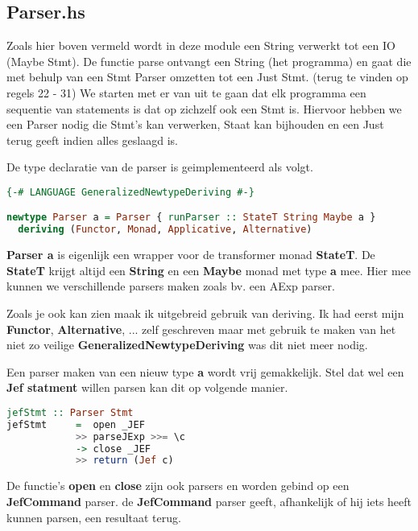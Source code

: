 \documentclass[]{article}
\begin{document}
\subsection{Parser.hs}

Zoals hier boven vermeld wordt in deze module een String verwerkt tot een IO (Maybe Stmt). De functie parse ontvangt een String (het programma) en gaat die met behulp van een Stmt Parser omzetten tot een Just Stmt. (terug te vinden op regels 22 - 31) We starten met er van uit te gaan dat elk programma een sequentie van statements is dat op zichzelf ook een Stmt is. Hiervoor hebben we een Parser nodig die Stmt's kan verwerken, Staat kan bijhouden en een Just terug geeft indien alles geslaagd is. 

De type declaratie van de parser is geimplementeerd als volgt. 

\begin{lstlisting}[language=Haskell]
{-# LANGUAGE GeneralizedNewtypeDeriving #-}

newtype Parser a = Parser { runParser :: StateT String Maybe a }
  deriving (Functor, Monad, Applicative, Alternative)
\end{lstlisting}

\textbf{Parser a} is eigenlijk een wrapper voor de transformer monad \textbf{StateT}. De \textbf{StateT} krijgt altijd een \textbf{String} en een \textbf{Maybe} monad met type \textbf{a} mee. Hier mee kunnen we verschillende parsers maken zoals bv. een AExp parser.

\-

Zoals je ook kan zien maak ik uitgebreid gebruik van deriving. Ik had eerst mijn \textbf{Functor}, \textbf{Alternative}, ... zelf geschreven maar met gebruik te maken van het niet zo veilige \textbf{GeneralizedNewtypeDeriving} was dit niet meer nodig. 

\-

Een parser maken van een nieuw type \textbf{a} wordt vrij gemakkelijk. Stel dat wel een \textbf{Jef statment} willen parsen kan dit op volgende manier.

\begin{lstlisting}[language=Haskell]
jefStmt :: Parser Stmt
jefStmt     =  open _JEF
            >> parseJExp >>= \c
            -> close _JEF
            >> return (Jef c)
\end{lstlisting}

De functie's \textbf{open} en \textbf{close} zijn ook parsers en worden gebind op een \textbf{JefCommand} parser.
de \textbf{JefCommand} parser geeft, afhankelijk of hij iets heeft kunnen parsen, een resultaat terug.
\end{document}
